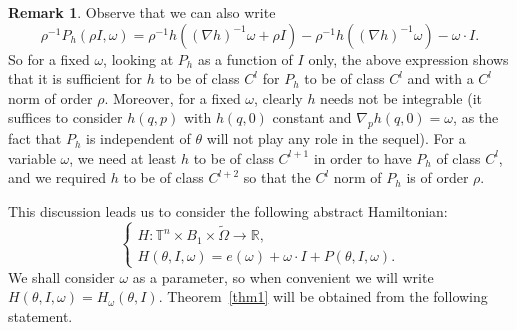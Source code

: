 \documentclass[11pt]{article}
\numberwithin{equation}{section}
\theoremstyle{plain}
\theoremstyle{definition}
\newtheorem{remark}[theorem]{Remark}
\newcommand{\R}{\mathbb{R}}
\newcommand\T{\mathbb T}
\begin{document}
\begin{remark}\label{reg}
Observe that we can also write
\[ \rho^{-1}P_h(\rho I,\omega)=\rho^{-1}h((\nabla h)^{-1}\omega+\rho I)-\rho^{-1}h((\nabla h)^{-1}\omega)-\omega\cdot I. \]
So for a fixed $\omega$, looking at $P_h$ as a function of $I$ only, the above expression shows that it is sufficient for $h$ to be of class $C^l$ for $P_h$ to be of class $C^l$ and with a $C^l$ norm of order $\rho$. Moreover, for a fixed $\omega$, clearly $h$ needs not be integrable (it suffices to consider $h(q,p)$ with $h(q,0)$ constant and $\nabla_p h(q,0)=\omega$, as the fact that $P_h$ is independent of $\theta$ will not play any role in the sequel). For a variable $\omega$, we need at least $h$ to be of class $C^{l+1}$ in order to have $P_h$ of class $C^l$, and we required $h$ to be of class $C^{l+2}$ so that the $C^l$ norm of $P_h$ is of order $\rho$.
\end{remark}

This discussion leads us to consider the following abstract Hamiltonian:
\begin{equation}\label{Ham2}
\begin{cases}
H : \T^n \times B_1 \times \tilde{\Omega} \to \R, \\
H(\theta,I,\omega)=e(\omega)+ \omega\cdot I + P(\theta,I,\omega).
\end{cases}\tag{$**$}
\end{equation}
We shall consider $\omega$ as a parameter, so when convenient we will write $H(\theta,I,\omega)=H_\omega(\theta,I)$. Theorem~\ref{thm1} will be obtained from the following statement.
\end{document}

